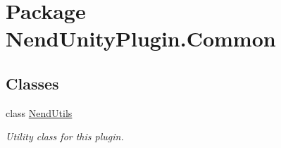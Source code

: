 \hypertarget{namespace_nend_unity_plugin_1_1_common}{}\section{Package Nend\+Unity\+Plugin.\+Common}
\label{namespace_nend_unity_plugin_1_1_common}
\subsection*{Classes}
\begin{DoxyCompactItemize}
\item 
class \hyperlink{class_nend_unity_plugin_1_1_common_1_1_nend_utils}{Nend\+Utils}
\begin{DoxyCompactList}\small\item\em Utility class for this plugin. \end{DoxyCompactList}\end{DoxyCompactItemize}
